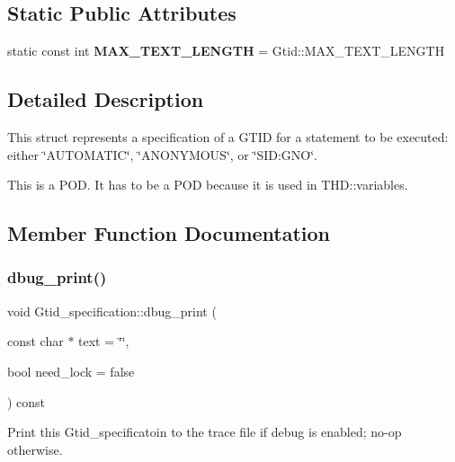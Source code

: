 \subsection*{Static Public Attributes}
\begin{DoxyCompactItemize}
\item 
\mbox{\label{structGtid__specification_aa70dab66f088cc7c143b838805ceee99}} 
static const int {\bfseries M\+A\+X\+\_\+\+T\+E\+X\+T\+\_\+\+L\+E\+N\+G\+TH} = Gtid\+::\+M\+A\+X\+\_\+\+T\+E\+X\+T\+\_\+\+L\+E\+N\+G\+TH
\end{DoxyCompactItemize}


\subsection{Detailed Description}
This struct represents a specification of a G\+T\+ID for a statement to be executed\+: either \char`\"{}\+A\+U\+T\+O\+M\+A\+T\+I\+C\char`\"{}, \char`\"{}\+A\+N\+O\+N\+Y\+M\+O\+U\+S\char`\"{}, or \char`\"{}\+S\+I\+D\+:\+G\+N\+O\char`\"{}.

This is a P\+OD. It has to be a P\+OD because it is used in T\+H\+D\+::variables. 

\subsection{Member Function Documentation}
\mbox{\label{structGtid__specification_aa8cc13996505c7b3521f139aa9296f92}} 
\subsubsection{\texorpdfstring{dbug\+\_\+print()}{dbug\_print()}}
{\footnotesize\ttfamily void Gtid\+\_\+specification\+::dbug\+\_\+print (\begin{DoxyParamCaption}\item[{const char $\ast$}]{text = {\ttfamily \char`\"{}\char`\"{}},  }\item[{bool}]{need\+\_\+lock = {\ttfamily false} }\end{DoxyParamCaption}) const\hspace{0.3cm}{\ttfamily [inline]}}

Print this Gtid\+\_\+specificatoin to the trace file if debug is enabled; no-\/op otherwise. \mbox{\label{structGtid__specification_ae3ba0f41c29ccc4a2af08392b7d32e6a}} 
